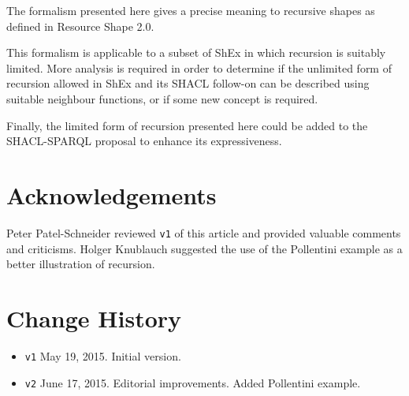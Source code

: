 \documentclass{article}
\begin{document}
The formalism presented here gives a precise meaning to recursive shapes as defined in Resource Shape 2.0.

This formalism is applicable to a subset of ShEx in which recursion is suitably limited.
More analysis is required in order to determine if the unlimited form of recursion allowed in ShEx and its SHACL follow-on
can be described using suitable neighbour functions, or if some new concept is required.

Finally, the limited form of recursion presented here could be added to the SHACL-SPARQL proposal to enhance its
expressiveness.

\cbstart
\section*{Acknowledgements}

Peter Patel-Schneider reviewed {\tt v1} of this article and provided valuable comments and criticisms.
Holger Knublauch suggested the use of the Pollentini example as a better illustration of recursion.

\section*{Change History}
\begin{itemize}
\item {\tt v1} May 19, 2015. Initial version.
\item {\tt v2} June 17, 2015. Editorial improvements. Added Pollentini example.
\end{itemize}
\cbend


\end{document}
